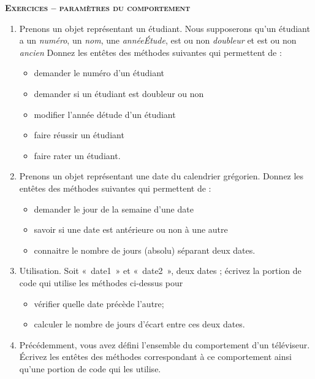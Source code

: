 \bigskip

{\sffamily\bfseries\scshape
Exercices – paramètres du comportement}

\liststyleWWviiiNumi
\begin{enumerate}
	\item {
	Prenons un objet représentant un étudiant. 
	Nous supposerons qu'un étudiant a un \textit{numéro}, un 
	\textit{nom}, une \textit{annéeÉtude}, est ou non 
	\textit{doubleur} et est ou non \textit{ancien}
	Donnez les entêtes des méthodes suivantes qui permettent de
	:}

	\liststyleListv
	\begin{itemize}
		\item {
		demander le numéro d'un étudiant}
		\item {
		demander si un étudiant est doubleur ou non}
		\item {
		modifier l'année détude d'un étudiant}
		\item {
		faire réussir un étudiant}
		\item {
		faire rater un étudiant.}
	\end{itemize}
		
	\item {
	Prenons un objet représentant une date du calendrier grégorien. 
	Donnez les entêtes des méthodes suivantes qui permettent de
	:}

	\liststyleListv
	\begin{itemize}
		\item{
		demander le jour de la semaine d'une date}
		\item {
		savoir si une date est antérieure ou non à une autre}
		\item {
		connaitre le nombre de jours (absolu) séparant deux dates.}
	\end{itemize}
	
	\item {
	Utilisation. Soit «~date1~» et «~date2~», deux dates ; écrivez la
	portion de code qui utilise les méthodes ci-dessus pour}
	
	\liststyleListv
	\begin{itemize}
		\item {
		vérifier quelle date précède l'autre;}
		\item {
		calculer le nombre de jours d'écart entre ces deux
		dates.}
	\end{itemize}
	
	\item {
	Précédemment, vous avez défini l'ensemble du
	comportement d'un téléviseur. Écrivez les entêtes des
	méthodes correspondant à ce comportement ainsi qu'une
	portion de code qui les utilise.}
\end{enumerate}

